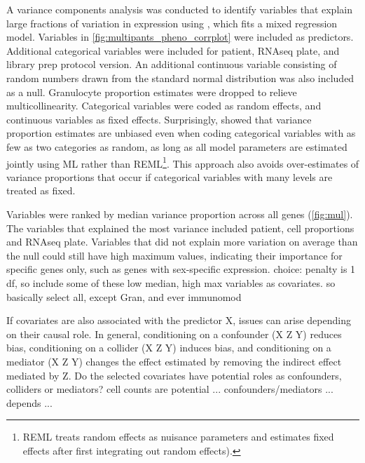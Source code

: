\begin{outline}
A variance components analysis was conducted to identify variables that explain large fractions of variation in expression
using \autocite{hoffman2016VariancePartitionInterpretingDrivers}, which fits a mixed regression model.
Variables in \autoref{fig:multipants_pheno_corrplot} were included as predictors.
Additional categorical variables were included for patient, \gls{RNAseq} plate, and library prep protocol version.
An additional continuous variable consisting of random numbers drawn from the standard normal distribution was also included as a null.
Granulocyte proportion estimates were dropped to relieve multicollinearity.
Categorical variables were coded as random effects, and continuous variables as fixed effects.
Surprisingly, \textcite{hoffman2016VariancePartitionInterpretingDrivers} showed that variance proportion estimates are unbiased even when coding categorical variables with as few as two categories as random, 
as long as all model parameters are estimated jointly using \gls{ML} rather than \gls{REML}\footnote{
    \gls{REML} treats random effects as nuisance parameters and estimates fixed effects after first integrating out random effects).
}.
This approach also avoids over-estimates of variance proportions that occur if categorical variables with many levels are treated as fixed.

\1 Variables were ranked by median variance proportion across all genes (\autoref{fig:mul}).
The variables that explained the most variance included patient, cell proportions and \gls{RNAseq} plate.
Variables that did not explain more variation on average than the null could still have high maximum values, 
indicating their importance for specific genes only, such as genes with sex-specific expression.
    \2 choice: penalty is 1 df, so include some of these low median, high max variables as covariates.
    \2 so basically select all, except Gran, and ever immunomod

\1 If covariates are also associated with the predictor X, issues can arise depending on their causal role.
In general,
conditioning on a confounder (X \textleftarrow Z \textrightarrow Y) reduces bias,
conditioning on a collider (X \textrightarrow Z \textleftarrow Y) induces bias,
and conditioning on a mediator (X \textrightarrow Z \textrightarrow Y) changes the effect estimated by removing the indirect effect mediated by Z.
    \2 Do the selected covariates have potential roles as confounders, colliders or mediators?
    \2 cell counts are potential ... confounders/mediators ... depends ...


\end{outline}
